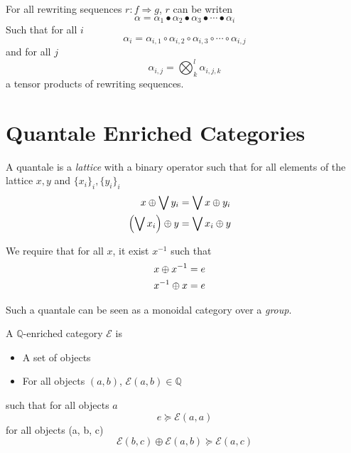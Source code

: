 \documentclass[a4paper]{article}
\begin{document}
\begin{corollary}
For all rewriting sequences $r: f \Rightarrow g$, $r$ can be writen
\[
\alpha = \alpha_1 \bullet \alpha_2 \bullet \alpha_3 \bullet \cdots \bullet
  \alpha_i
\]
Such that for all $i$
\[
\alpha_i = \alpha_{i, 1} \circ \alpha_{i, 2} \circ \alpha_{i, 3} \circ \cdots
  \circ \alpha_{i, j}
\]
and for all $j$
\[
\alpha_{i, j} = \bigotimes_k^l \alpha_{i, j, k}
\]
a tensor products of rewriting sequences.
\end{corollary}

\section{Quantale Enriched Categories}
\label{sec:quant-enrich-categ}


\begin{definition}
A quantale is a \emph{lattice} with a binary operator such that for all
  elements of the lattice $x, y$ and $\{x_i\}_i, \{y_i\}_i$
\begin{align}
x \oplus \bigvee y_i &= \bigvee x \oplus y_i \cr
\left(\bigvee x_i\right) \oplus y &= \bigvee x_i \oplus y
\end{align}

We require that for all $x$, it exist $x^{-1}$ such that
\begin{align}
x \oplus x^{-1} &= e \cr
x^{-1} \oplus x &= e
\end{align}

Such a quantale can be seen as a monoidal category over a \emph{group}.
\end{definition}

\begin{definition}
A $\mathbb{Q}$-enriched category $\mathcal{E}$ is

\begin{itemize}
\item A set of objects
\item For all objects $(a, b)$, $\mathcal{E}(a, b) \in \mathbb{Q}$
\end{itemize}

such that for all objects $a$
\[
e \succeq \mathcal{E}(a, a)
\]
for all objects (a, b, c)
\[
\mathcal{E}(b, c) \oplus \mathcal{E}(a, b) \succeq \mathcal{E}(a, c)
\]
\end{definition}
\end{document}
